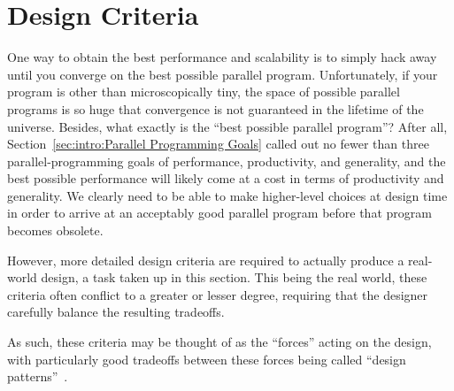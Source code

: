 
\section{Design Criteria}
\label{sec:SMPdesign:Design Criteria}

One way to obtain the best performance and scalability is to simply
hack away until you converge on the best possible parallel program.
Unfortunately, if your program is other than microscopically tiny,
the space of possible parallel programs is so huge
that convergence is not guaranteed in the lifetime of the universe.
Besides, what exactly is the ``best possible parallel program''?
After all, Section~\ref{sec:intro:Parallel Programming Goals}
called out no fewer than three parallel-programming goals of
performance, productivity, and generality,
and the best possible performance will likely come at a cost in
terms of productivity and generality.
We clearly need to be able to make higher-level choices at design
time in order to arrive at an acceptably good parallel program
before that program becomes obsolete.

However, more detailed design criteria are required to
actually produce a real-world design, a task taken up in this section.
This being the real world, these criteria often conflict to a
greater or lesser degree, requiring that the designer carefully
balance the resulting tradeoffs.

As such, these criteria may be thought of as the ``forces''
acting on the design, with particularly good tradeoffs between
these forces being called ``design patterns''~\cite{Alexander79,GOF95}.

